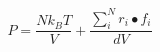 \documentclass[12pt]{article}
\begin{document}
$$
   P = \frac{N k_B T}{V} + \frac{\sum_{i}^{N} r_i \bullet f_i}{dV}
$$
\end{document}
